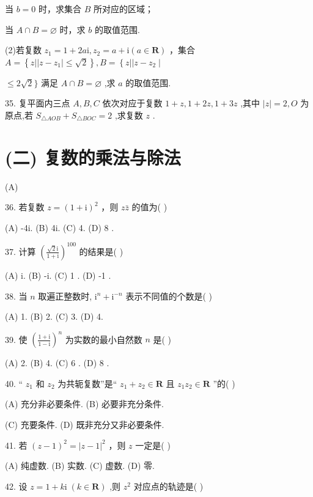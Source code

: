 \documentclass[10pt]{article}
\newcommand*\circled[1]{\tikz[baseline=(char.base)]{\node[shape=circle,draw,inner sep=1.5pt] (char) {\small #1};}}
\begin{document}
 \circled{1}  当 \(b = 0\) 时，求集合 \(B\) 所对应的区域；

 \circled{2} 当 \(A \cap  B = \varnothing\) 时，求 \(b\) 的取值范围.

(2)若复数 \({z}_{1} = 1 + {2a}\mathrm{i},{z}_{2} = a + \mathrm{i}\left( {a \in  \mathbf{R}}\right)\) ，集合 \(A = \left\{  {z\left| \right| z - {z}_{1} \mid   \leq  \sqrt{2}}\right\}  ,B = \left\{  {z\left| \right| z - {z}_{2} \mid  }\right.\)

\(\leq  2\sqrt{2}\}\) 满足 \(A \cap  B = \varnothing\) ,求 \(a\) 的取值范围.

35. 复平面内三点 \(A,B,C\) 依次对应于复数 \(1 + z,1 + {2z},1 + {3z}\) ,其中 \(\left| z\right|  = 2,O\) 为原点,若 \({S}_{\bigtriangleup {AOB}} + {S}_{\bigtriangleup {BOC}} = 2\) ,求复数 \(z\) .

\section*{(二) 复数的乘法与除法}

(A)

36. 若复数 \(z = {\left( 1 + \mathrm{i}\right) }^{2}\) ，则 \(z\bar{z}\) 的值为( )

(A) -4i. (B) 4i. (C) 4. (D) 8 .

37. 计算 \({\left( \frac{\sqrt{2}\mathrm{i}}{1 + \mathrm{i}}\right) }^{100}\) 的结果是( )

(A) i. (B) -i. (C) 1 . (D) -1 .

38. 当 \(n\) 取遍正整数时, \({\mathrm{i}}^{n} + {\mathrm{i}}^{-n}\) 表示不同值的个数是( )

(A) 1. (B) 2. (C) 3. (D) 4.

39. 使 \({\left( \frac{1 + \mathrm{i}}{1 - \mathrm{i}}\right) }^{n}\) 为实数的最小自然数 \(n\) 是( )

(A) 2. (B) 4. (C) 6 . (D) 8 .

40. “ \({z}_{1}\) 和 \({z}_{2}\) 为共轭复数”是“ \({z}_{1} + {z}_{2} \in  \mathbf{R}\) 且 \({z}_{1}{z}_{2} \in  \mathbf{R}\) ”的( )

(A) 充分非必要条件. (B) 必要非充分条件.

(C) 充要条件. (D) 既非充分又非必要条件.

41. 若 \({\left( z - 1\right) }^{2} = {\left| z - 1\right| }^{2}\) ，则 \(z\) 一定是( )

(A) 纯虚数. (B) 实数. (C) 虚数. (D) 零.

42. 设 \(z = 1 + k\mathrm{i}\;\left( {k \in  \mathbf{R}}\right)\) ,则 \({z}^{2}\) 对应点的轨迹是( )
\end{document}
